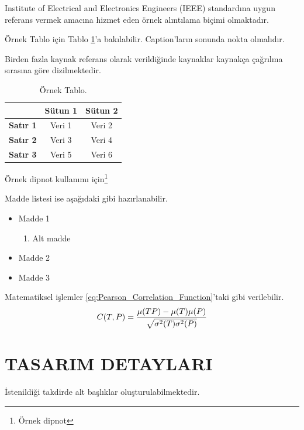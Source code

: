 \documentclass[a4paper,oneside,onecolumn,11pt]{report}
\begin{document}
Institute of Electrical and Electronics Engineers (IEEE) standardına uygun referans vermek amacına hizmet eden örnek alıntılama biçimi \cite{Lamport1986} olmaktadır. 


Örnek Tablo için Tablo \ref{table:ornek_tablo}'a bakılabilir. Caption'ların sonunda nokta olmalıdır.

Birden fazla kaynak referans olarak verildiğinde kaynaklar kaynakça çağrılma sırasına göre dizilmektedir. \cite{IEEEexample:bibtexguide}

\begin{table}[thbp]
\caption[Örnek Tablo]{Örnek Tablo.}
\begin{center}
\begin{tabular}{|c|c|c|} \hline
 & \textbf{Sütun 1}& \textbf{Sütun 2}\\\hline
\textbf{Satır 1} & Veri 1 & Veri 2 \\\hline
\textbf{Satır 2} & Veri 3 & Veri 4 \\\hline
\textbf{Satır 3} & Veri 5 & Veri 6 \\\hline
\end{tabular}
\label{table:ornek_tablo}
\end{center}
\end{table}



Örnek dipnot kullanımı için\footnote{Örnek dipnot}  

Madde listesi ise aşağıdaki gibi hazırlanabilir.


\begin{itemize}
 \item Madde 1
\begin{enumerate}
 \item Alt madde
\end{enumerate}
\item Madde 2
\item Madde 3
\end{itemize}

Matematiksel işlemler \eqref{eq:Pearson_Correlation_Function}'taki gibi verilebilir.
\begin{equation} \label{eq:Pearson_Correlation_Function}
C (T, P) = \displaystyle \frac{\mu (TP)-\mu (T) \mu (P)}{\sqrt{\sigma ^2 (T) \sigma ^2 (P)}} \\
\end{equation}

\chapter{TASARIM DETAYLARI}
\label{chapter:tasarim_detaylari}
İstenildiği takdirde alt başlıklar oluşturulabilmektedir.
\end{document}
